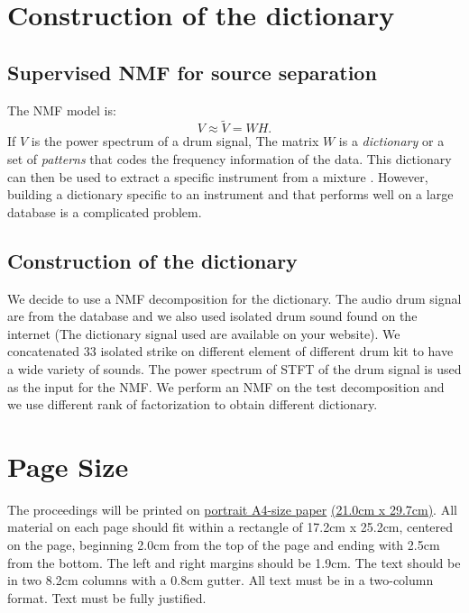 \documentclass{article}
\begin{document}
\section{Construction of the dictionary}


\subsection{Supervised NMF for source separation}

The NMF model is:
\begin{equation}
V \approx \tilde{V} = WH.
\end{equation}
If $V$ is the power spectrum of a drum signal, The matrix $W$ is a {\em dictionary} or a set of {\em patterns} that codes the frequency information of the data. This dictionary can then be used to extract a specific instrument from a mixture \cite{jaureguiberry2011adaptation,kim2011nonnegative}. However, building a dictionary specific to an instrument and that performs well on a large database is a complicated problem. 


\subsection{Construction of the dictionary}

We decide to use a NMF decomposition for the dictionary. The audio drum signal are from the database \cite{gillet2006enst} and we also used isolated drum sound found on the internet (The dictionary signal used are available on your website). We concatenated $33$ isolated strike on different element of different drum kit to have a wide variety of sounds. The power spectrum of STFT of the drum signal is used as the input for the NMF. We perform an NMF on the test decomposition and we use different rank of factorization to obtain different dictionary.



\section{Page Size}\label{sec:page_size}

The proceedings will be printed on
 \underline{portrait A4-size paper} \underline{(21.0cm x 29.7cm)}.
All material on each page should fit within a rectangle of 17.2cm x 25.2cm,
centered on the page, beginning 2.0cm
from the top of the page and ending with 2.5cm from the bottom.
The left and right margins should be 1.9cm.
The text should be in two 8.2cm columns with a 0.8cm gutter.
All text must be in a two-column format.
Text must be fully justified.
\end{document}
